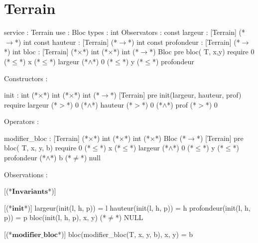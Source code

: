\documentclass[a4paper, 11pt]{report}
\newcommand{\specB}[1]{\textbf{#1}}
\begin{document}
\section{Terrain}
\begin{Spe}
service : Terrain
use : Bloc
types : int
Observators :
	const largeur : [Terrain] (*$\rightarrow$*) int
	const hauteur : [Terrain] (*$\rightarrow$*) int
	const profondeur : [Terrain] (*$\rightarrow$*) int
	bloc : [Terrain] (*$\times$*) int (*$\times$*) int (*$\rightarrow$*) Bloc
		pre bloc( T, x,y) require 0 (*$\leq$*) x (*$\leq$*) largeur (*$\land$*) 0 (*$\leq$*) y (*$\leq$*) profondeur
             
Constructors :

	init : int (*$\times$*) int (*$\times$*) int (*$\rightarrow$*) [Terrain]
		pre init(largeur, hauteur, prof) require largeur (*$>$*) 0 (*$\land$*) hauteur (*$>$*) 0 (*$\land$*) prof (*$>$*) 0
             
Operators : 

	modifier_bloc : [Terrain] (*$\times$*) int (*$\times$*) int (*$\times$*) Bloc (*$\rightarrow$*) [Terrain]
		pre bloc( T, x, y, b) require 0 (*$\leq$*) x (*$\leq$*) largeur (*$\land$*) 0 (*$\leq$*) y (*$\leq$*) profondeur (*$\land$*) b (*$\neq$*) null
             
Observations :

      [(*$\specB{Invariants}$*)]
      
      [(*$\specB{init}$*)]
            largeur(init(l, h, p)) = l
            hauteur(init(l, h, p)) = h
            profondeur(init(l, h, p)) = p
            bloc(init(l, h, p), x, y) (*$\neq$*) NULL
            
      [(*$\specB{modifier\_bloc}$*)]
            bloc(modifier_bloc(T, x, y, b), x, y) = b 
            
\end{Spe}
\end{document}
